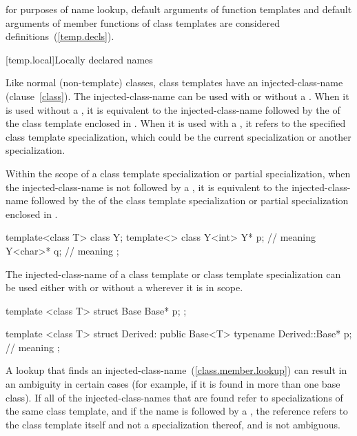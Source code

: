 \pnum
\enternote
for purposes of name lookup,
default arguments of function templates and default arguments of
member functions of class templates are considered definitions~(\ref{temp.decls}).
\exitnoteb

[temp.local]{Locally declared names}

\pnum
Like normal (non-template) classes, class templates have an
injected-class-name (clause~\ref{class}).
The
injected-class-name can be used with or without a
.
When it is used without a
,
it is equivalent to the injected-class-name
followed by the  of the class template
enclosed in \tcode{<>}.
When it is used with a
,
it refers to the specified class template specialization, which could be
the current specialization or another specialization.

\pnum
Within the scope of a class template specialization or
partial specialization, when the injected-class-name is
not followed by a \tcode{<}, it is equivalent to the injected-class-name
followed by the
of the class template specialization or partial
specialization enclosed in
\tcode{<>}.
\enterexample
\begin{codeblock}
template<class T> class Y;
template<> class Y<int> {
    Y* p;                       // meaning 
    Y<char>* q;                 // meaning 
};
\end{codeblock}
\exitexampleb

\pnumalt
The injected-class-name of a class template or class
template specialization can be used either with or without a
wherever it is in scope.
\enterexample

\begin{codeblock}
template <class T> struct Base {
    Base* p;
};

template <class T> struct Derived: public Base<T> {
    typename Derived::Base* p;  // meaning 
};
\end{codeblock}
\exitexampleb

\pnumalt
A lookup that finds an injected-class-name~(\ref{class.member.lookup}) can result in an ambiguity in
certain cases (for example, if it is found in more than one
base class).
If all of the injected-class-names that are
found refer to specializations of the same class template,
and if the name is followed by a
,
the reference refers to the class template itself and not a
specialization thereof, and is not ambiguous.
\enterexample

